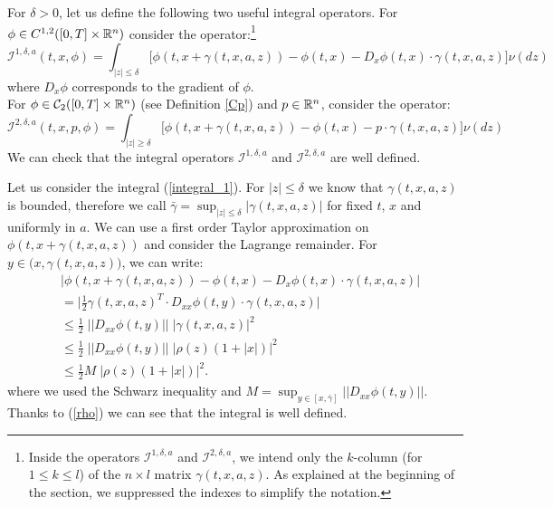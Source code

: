 For $\delta > 0$, let us define the following two useful integral operators.
For $\phi \in C^{1,2}([0,T] \times \mathbb{R}^n) $ consider the operator:\footnote{Inside the operators $\mathcal{I}^{1,\delta,a}$ and $\mathcal{I}^{2,\delta,a}$, 
we intend only the $k$-column (for $1\leq k \leq l$) of the $n\times l$ matrix $\gamma(t,x,a,z)$. As explained at the beginning of the section, 
we suppressed the indexes to simplify the notation. }
\begin{equation}\label{integral_1}
 \mathcal{I}^{1,\delta,a}(t,x,\phi) = \int_{|z| \leq \delta}
\biggl[ \phi(t,x + \gamma(t,x,a,z)) - \phi(t,x) - D_x \phi(t,x) \cdot \gamma(t,x,a,z) \biggr] \nu(dz)
\end{equation}
where $D_x \phi$ corresponds to the gradient of $\phi$.\\
For $\phi \in \mathcal{C}_2([0,T] \times \mathbb{R}^n) $ (see Definition \ref{Cp}) and $p \in \mathbb{R}^n$, consider the operator:
\begin{equation}\label{integral_2}
\mathcal{I}^{2,\delta,a}(t,x,p,\phi) = \int_{|z|\geq \delta}
\biggl[ \phi(t,x+ \gamma(t,x,a,z)) - \phi(t,x) - p \cdot \gamma(t,x,a,z) \biggr] \nu(dz)
\end{equation}
We can check that the integral operators $\mathcal{I}^{1,\delta,a}$ and $\mathcal{I}^{2,\delta,a}$ are well defined.

Let us consider the integral (\ref{integral_1}). For $|z| \leq \delta$ we know that $\gamma(t,x,a,z)$ is bounded, therefore we call  
$ \bar \gamma = \sup_{|z| \leq \delta} |\gamma(t,x,a,z)|$ for fixed $t$, $x$ and uniformly in $a$. 
We can use a first order Taylor approximation on $\phi(t,x + \gamma(t,x,a,z))$ and consider the Lagrange remainder. 
For $y \in \bigl(x, \gamma(t,x,a,z)\bigr)$, we can write:
\begin{align*}
 & \bigg|\phi(t,x + \gamma(t,x,a,z)) - \phi(t,x) - D_x \phi(t,x) \cdot \gamma(t,x,a,z) \bigg| \\ 
 & = \bigg| \frac{1}{2} \gamma(t,x,a,z)^T \cdot  D_{xx} \phi(t,y) \cdot \gamma(t,x,a,z) \bigg| \\   %
 & \leq \frac{1}{2} \; \bigg|\bigg| D_{xx} \phi(t,y) \bigg|\bigg| \;  \big| \gamma(t,x,a,z) \big|^2 \\
 & \leq \frac{1}{2} \; \bigg|\bigg| D_{xx} \phi(t,y) \bigg|\bigg| \; \big| \rho(z) (1+|x|)  \big|^2 \\
 & \leq \frac{1}{2} M \; \big| \rho(z) (1+|x|)  \big|^2.
\end{align*}
where we used the Schwarz inequality and $M = \sup_{y \in [x, \bar \gamma]} || D_{xx} \phi(t,y) ||$. 
Thanks to (\ref{rho}) we can see that the integral is well defined.

